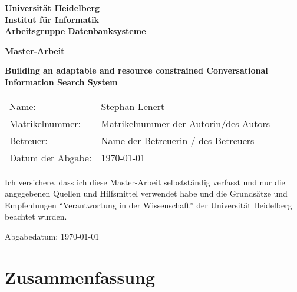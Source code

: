 \documentclass[
     12pt,         %
     a4paper,      %
     BCOR10mm,     %
     DIV14,        %
     ]{scrreprt}
\begin{document}
\begin{titlepage}


\vspace*{1cm}
\begin{center}
\vspace*{3cm}
\textbf{ 
\Large Universität Heidelberg\\
\smallskip
\Large Institut für Informatik\\
\smallskip
\Large Arbeitsgruppe Datenbanksysteme\\
\smallskip
}

\vspace{3cm}

\textbf{\large Master-Arbeit} %

\vspace{0.5\baselineskip}
{\huge
\textbf{Building an adaptable and resource constrained Conversational Information Search System}
}
\end{center}

\vfill 

{\large
\begin{tabular}[l]{ll}
Name: & Stephan Lenert\\
Matrikelnummer: & Matrikelnummer  der Autorin/des Autors\\
Betreuer: & Name der Betreuerin / des Betreuers\\
Datum der Abgabe: & \today
\end{tabular}
}

\end{titlepage}

\onehalfspacing

\thispagestyle{empty}

\vspace*{100pt}
\noindent
Ich versichere, dass ich diese Master-Arbeit selbstständig verfasst und nur die angegebenen
Quellen und Hilfsmittel verwendet habe und die Grundsätze und
Empfehlungen ``Verantwortung in der Wissenschaft'' der Universität Heidelberg beachtet wurden. 

\vspace*{50pt}
\noindent

\underline{\phantom{mmmmmmmmmmmmmmmmmmmm}}

\medskip
\noindent 
Abgabedatum: \today
\newpage

\chapter*{Zusammenfassung}

\newpage
\end{document}
